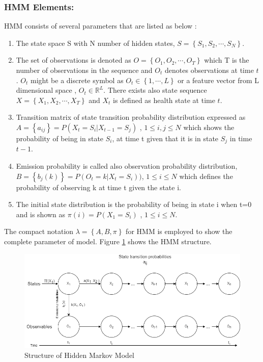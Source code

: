 \subsubsection*{HMM Elements:}
HMM consists of several parameters \cite{camci2005dynamic, DBLP:journals/tase/CamciC10} that are listed as below :
\begin{enumerate}
    \item The state space S with N number of hidden states, $S=\left \{ S_{1},S_{2},\cdots,S_{N} \right \}$.\vspace*{-3mm}
    \item The set of observations is denoted as  
    $O=\left \{ O_{1},O_{2},\cdots,O_{T} \right \}$ which T is the number of observations in the sequence and $O_{t}$ denotes observations at time $t$. $O_{t}$ might be a discrete symbol  as $O_{t}\in \left \{ 1,\cdots ,L \right \} $ or a feature vector from L dimensional space , $O_{t}\in \mathbb{R}^{L} $.
    There exists also state sequence $X=\left \{ X_{1},X_{2},\cdots,X_{T} \right \}$  and $X_{t}$ is defined as health state at time $t$.\vspace*{-3mm}
    \item Transition matrix of state transition probability distribution expressed as $ A=\left \{  a_{ij}\right \}=P(X_{t}=S_{i}|X_{t-1}=S_{j})$ , $1\leq i,j\leq N$ which shows the probability of being in state $S_{i}$, at time t given that it is in state $S_{j}$ in time $t-1$.\vspace*{-3mm}
    \item Emission probability is called also observation probability distribution, $B=\left \{  b_{j}\left ( k \right )\right \}=P(O_{t}=k|X_{t}=S_{i}))$,  $1\leq i\leq N$ which defines the probability of observing k at time t given the state i.\vspace*{-3mm}
    \item The initial state distribution is the probability of being in state i when t=0 and is shown as $ \pi \left ( i \right )=P\left ( X_{1}=S_{i} \right )$ ,  $1\leq i\leq N$.
\end{enumerate}
    
The compact notation $\lambda =\left \{ A,B,\pi  \right \}$  for HMM is employed to show the complete parameter of model. Figure \ref{fig:HMM structure} shows the HMM structure.
\newline

\begin{figure}[H]
	\centering
	\includegraphics[width=12cm]{gfx/HMM.png}
    \captionsetup{justification=centering}
	\caption{Structure of Hidden Markov Model}
	\label{fig:HMM structure}
\end{figure}

